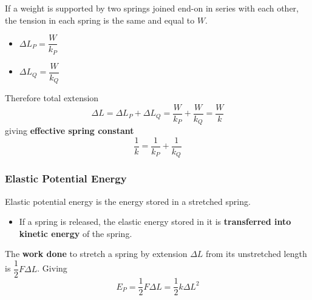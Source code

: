 If a weight is supported by two springs joined end-on in series with each other, the tension in each spring is the same and equal to $W$.

\begin{itemize}
    \item $\Delta L_P=\dfrac{W}{k_P}$
    \item $\Delta L_Q=\dfrac{W}{k_Q}$
\end{itemize}

Therefore total extension
$$\Delta L=\Delta L_P+\Delta L_Q=\frac{W}{k_P}+\frac{W}{k_Q}=\frac{W}{k}$$
giving \textbf{effective spring constant}
$$\frac{1}{k}=\frac{1}{k_P}+\frac{1}{k_Q}$$

\subsubsection*{Elastic Potential Energy}

Elastic potential energy is the energy stored in a stretched spring.
\begin{itemize}
    \item If a spring is released, the elastic energy stored in it is \textbf{transferred into kinetic energy} of the spring.
\end{itemize}

The \textbf{work done} to stretch a spring by extension $\Delta L$ from its unstretched length is $\dfrac{1}{2}F\Delta L$. Giving
$$E_P=\frac{1}{2}F\Delta L=\frac{1}{2}k\Delta L^2$$
